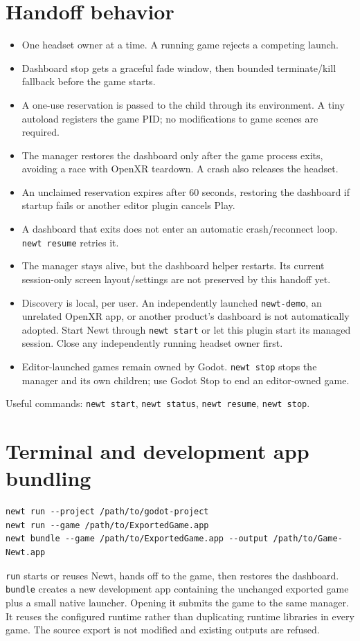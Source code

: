 \documentclass[11pt]{article}
\begin{document}
\section{Handoff behavior}
\label{sec:orgf0a4555}
\begin{itemize}
\item One headset owner at a time. A running game rejects a competing launch.
\item Dashboard stop gets a graceful fade window, then bounded terminate/kill fallback before the game starts.
\item A one-use reservation is passed to the child through its environment. A tiny autoload registers the game PID; no modifications to game scenes are required.
\item The manager restores the dashboard only after the game process exits, avoiding a race with OpenXR teardown. A crash also releases the headset.
\item An unclaimed reservation expires after 60 seconds, restoring the dashboard if startup fails or another editor plugin cancels Play.
\item A dashboard that exits does not enter an automatic crash/reconnect loop. \texttt{newt resume} retries it.
\item The manager stays alive, but the dashboard helper restarts. Its current session-only screen layout/settings are not preserved by this handoff yet.
\item Discovery is local, per user. An independently launched \texttt{newt-demo}, an unrelated OpenXR app, or another product's dashboard is not automatically adopted. Start Newt through \texttt{newt start} or let this plugin start its managed session. Close any independently running headset owner first.
\item Editor-launched games remain owned by Godot. \texttt{newt stop} stops the manager and its own children; use Godot Stop to end an editor-owned game.
\end{itemize}

Useful commands: \texttt{newt start}, \texttt{newt status}, \texttt{newt resume}, \texttt{newt stop}.
\section{Terminal and development app bundling}
\label{sec:orgba0a3f9}
\begin{verbatim}
newt run --project /path/to/godot-project
newt run --game /path/to/ExportedGame.app
newt bundle --game /path/to/ExportedGame.app --output /path/to/Game-Newt.app
\end{verbatim}
\texttt{run} starts or reuses Newt, hands off to the game, then restores the dashboard. \texttt{bundle} creates a new development app containing the unchanged exported game plus a small native launcher. Opening it submits the game to the same manager. It reuses the configured runtime rather than duplicating runtime libraries in every game. The source export is not modified and existing outputs are refused.
\end{document}
